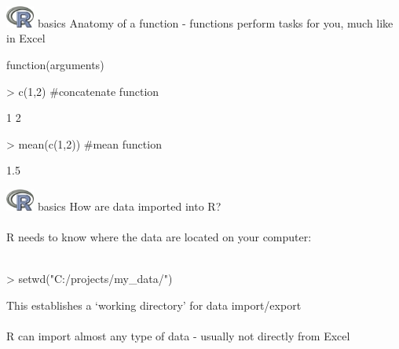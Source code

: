 \documentclass[xcolor=svgnames]{beamer}
\begin{document}
\begin{frame}[fragile]{\includegraphics[width=0.07\textwidth]{Rlogo.jpg} \hspace{0.01in} basics}
Anatomy of a function - functions perform tasks for you, much like in Excel
\begin{center}
\Large
function(arguments)
\end{center}
\begin{Schunk}
\begin{Sinput}
> c(1,2) #concatenate function
\end{Sinput}
\begin{Soutput}
[1] 1 2
\end{Soutput}
\begin{Sinput}
> mean(c(1,2)) #mean function
\end{Sinput}
\begin{Soutput}
[1] 1.5
\end{Soutput}
\end{Schunk}
\end{frame}

\begin{frame}[t,fragile]{\includegraphics[width=0.07\textwidth]{Rlogo.jpg} \hspace{0.01in} basics}
How are data imported into R?\\~\\
R needs to know where the data are located on your computer:\\~\\
\begin{Schunk}
\begin{Sinput}
> setwd("C:/projects/my_data/")
\end{Sinput}
\end{Schunk}
\vspace{0.2in}
This establishes a `working directory' for data import/export\\~\\
R can import almost any type of data - usually not directly from Excel\\~\\
\end{frame}
\end{document}
